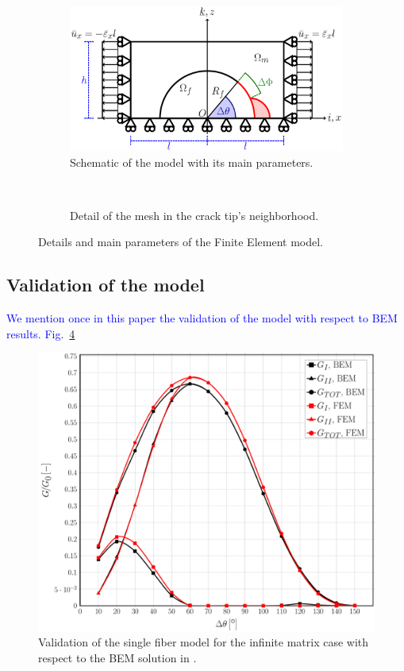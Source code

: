 \documentclass[review]{elsarticle}
\begin{document}
\begin{figure}[!h]
\centering
    \begin{subfigure}[b]{0.5\textwidth}
        \includegraphics[width=\textwidth]{RUC.pdf}
        \caption{Schematic of the model with its main parameters.}\label{subfig:modelschem}
    \end{subfigure} ~
    \begin{subfigure}[b]{0.45\textwidth}
        \caption{Detail of the mesh in the crack tip's neighborhood.}\label{subfig:meshdetail}
    \end{subfigure}

\caption{Details and main parameters of the Finite Element model.}\label{fig:FEmodel}
\end{figure}

\subsection{Validation of the model}

\textcolor{blue}{We mention once in this paper the validation of the model with respect to BEM results. Fig.~\ref{fig:validation}}

\begin{figure}[!h]
\centering
\includegraphics[width=\textwidth]{validation-VCCT.pdf}
\caption{Validation of the single fiber model for the infinite matrix case with respect to the BEM solution in \cite{}.}\label{fig:validation}
\end{figure}
\end{document}
